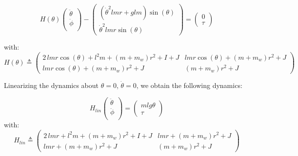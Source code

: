 \documentclass[a4paper,11pt]{article}
\begin{document}
\begin{equation}
H(\theta)
\begin{pmatrix}
\ddot{\theta} \\
\ddot{\phi} \\
\end{pmatrix}
-
\begin{pmatrix}
{\left({\dot{\theta}}^{2} l m r + g l m\right)} \sin\left({\theta}\right) \\
{\dot{\theta}}^{2} l m r \sin\left({\theta}\right)
\end{pmatrix} = \begin{pmatrix} 0 \\ \tau \end{pmatrix}
\end{equation}

with:
\begin{equation}
	H(\theta) \triangleq  \begin{pmatrix}
	2 \, l m r \cos\left({\theta}\right) + l^{2} m + {\left(m + {m_w}\right)} r^{2} + I + J & l m r \cos\left({\theta}\right) + {\left(m + {m_w}\right)} r^{2} + J \\
	l m r \cos\left({\theta}\right) + {\left(m + {m_w}\right)} r^{2} + J & {\left(m + {m_w}\right)} r^{2} + J
	\end{pmatrix}
\end{equation}

Linearizing the dynamics about $\theta = 0$, $\dot{\theta} = 0$, we obtain the following dynamics:

\begin{equation}
H_{lin}
\begin{pmatrix}
\ddot{\theta} \\
\ddot{\phi} \\
\end{pmatrix}
=
\begin{pmatrix}
m l g \theta \\
\tau
\end{pmatrix}
\end{equation}
with:
\begin{equation}
H_{lin} \triangleq  \begin{pmatrix}
2 \, l m r  + l^{2} m + {\left(m + {m_w}\right)} r^{2} + I + J & l m r  + {\left(m + {m_w}\right)} r^{2} + J \\
l m r  + {\left(m + {m_w}\right)} r^{2} + J & {\left(m + {m_w}\right)} r^{2} + J
\end{pmatrix}
\label{eSegwayDynamicsLinPhi}
\end{equation}
\end{document}
